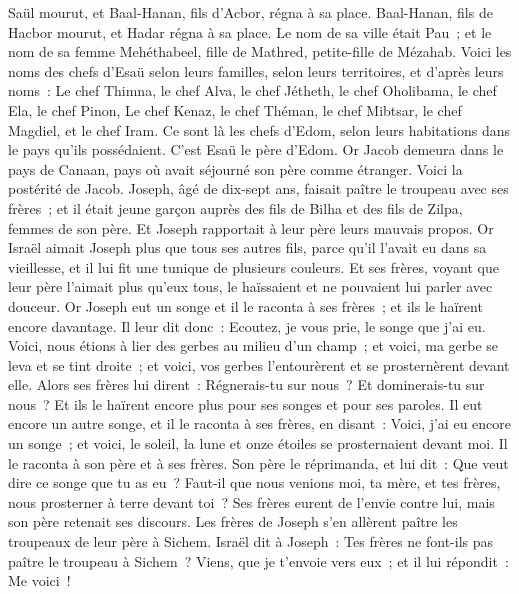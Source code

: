 \begin{multicols}{2}
Saül mourut, et Baal-Hanan, fils d'Acbor, régna à sa place.
Baal-Hanan, fils de Hacbor mourut, et Hadar régna à sa place. Le nom de sa ville était Pau~; et le nom de sa femme Mehéthabeel, fille de Mathred, petite-fille de Mézahab.
Voici les noms des chefs d'Esaü selon leurs familles, selon leurs territoires, et d'après leurs noms~: Le chef Thimna, le chef Alva, le chef Jétheth,
le chef Oholibama, le chef Ela, le chef Pinon,
Le chef Kenaz, le chef Théman, le chef Mibtsar,
le chef Magdiel, et le chef Iram. Ce sont là les chefs d'Edom, selon leurs habitations dans le pays qu'ils possédaient. C'est Esaü le père d'Edom.
\VerseOne{}Or Jacob demeura dans le pays de Canaan, pays où avait séjourné son père comme étranger.
Voici la postérité de Jacob. Joseph, âgé de dix-sept ans, faisait paître le troupeau avec ses frères~; et il était jeune garçon auprès des fils de Bilha et des fils de Zilpa, femmes de son père. Et Joseph rapportait à leur père leurs mauvais propos.
Or Israël aimait Joseph plus que tous ses autres fils, parce qu'il l'avait eu dans sa vieillesse, et il lui fit une tunique de plusieurs couleurs.
Et ses frères, voyant que leur père l'aimait plus qu'eux tous, le haïssaient et ne pouvaient lui parler avec douceur.
Or Joseph eut un songe et il le raconta à ses frères~; et ils le haïrent encore davantage.
Il leur dit donc~: Ecoutez, je vous prie, le songe que j'ai eu.
Voici, nous étions à lier des gerbes au milieu d'un champ~; et voici, ma gerbe se leva et se tint droite~; et voici, vos gerbes l'entourèrent et se prosternèrent devant elle.
Alors ses frères lui dirent~: Régnerais-tu sur nous~? Et dominerais-tu sur nous~? Et ils le haïrent encore plus pour ses songes et pour ses paroles.
Il eut encore un autre songe, et il le raconta à ses frères, en disant~: Voici, j'ai eu encore un songe~; et voici, le soleil, la lune et onze étoiles se prosternaient devant moi.
Il le raconta à son père et à ses frères. Son père le réprimanda, et lui dit~: Que veut dire ce songe que tu as eu~? Faut-il que nous venions moi, ta mère, et tes frères, nous prosterner à terre devant toi~?
Ses frères eurent de l'envie contre lui, mais son père retenait ses discours.
Les frères de Joseph s'en allèrent paître les troupeaux de leur père à Sichem.
Israël dit à Joseph~: Tes frères ne font-ils pas paître le troupeau à Sichem~? Viens, que je t'envoie vers eux~; et il lui répondit~: Me voici~!

\end{multicols}
